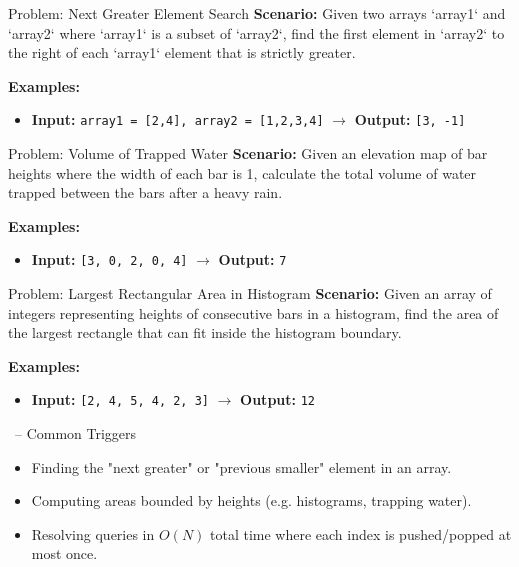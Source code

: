 \begin{frame}[fragile]{Problem: Next Greater Element Search}
  \textbf{Scenario:}
  Given two arrays `array1` and `array2` where `array1` is a subset of `array2`, find the first element in `array2` to the right of each `array1` element that is strictly greater.
  
  \vspace{0.3cm}
  \textbf{Examples:}
  \begin{itemize}
    \item \textbf{Input:} \texttt{array1 = [2,4], array2 = [1,2,3,4]} $\rightarrow$ \textbf{Output:} \texttt{[3, -1]}
  \end{itemize}
\end{frame}

\begin{frame}[fragile]{Problem: Volume of Trapped Water}
  \textbf{Scenario:}
  Given an elevation map of bar heights where the width of each bar is 1, calculate the total volume of water trapped between the bars after a heavy rain.
  
  \vspace{0.3cm}
  \textbf{Examples:}
  \begin{itemize}
    \item \textbf{Input:} \texttt{[3, 0, 2, 0, 4]} $\rightarrow$ \textbf{Output:} \texttt{7}
  \end{itemize}
\end{frame}

\begin{frame}[fragile]{Problem: Largest Rectangular Area in Histogram}
  \textbf{Scenario:}
  Given an array of integers representing heights of consecutive bars in a histogram, find the area of the largest rectangle that can fit inside the histogram boundary.
  
  \vspace{0.3cm}
  \textbf{Examples:}
  \begin{itemize}
    \item \textbf{Input:} \texttt{[2, 4, 5, 4, 2, 3]} $\rightarrow$ \textbf{Output:} \texttt{12}
  \end{itemize}
\end{frame}

\begin{frame}{\secname\ -- Common Triggers}
  \begin{itemize}
    \item Finding the "next greater" or "previous smaller" element in an array.
        \item Computing areas bounded by heights (e.g. histograms, trapping water).
        \item Resolving queries in $O(N)$ total time where each index is pushed/popped at most once.
  \end{itemize}
\end{frame}
